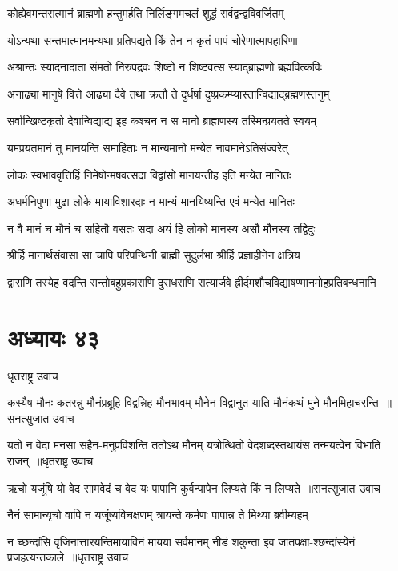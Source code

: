 \twolineshloka
{कोह्येवमन्तरात्मानं ब्राह्मणो हन्तुमर्हति}
{निर्लिङ्गमचलं शुद्धं सर्वद्वन्द्वविवर्जितम्}


\twolineshloka
{योऽन्यथा सन्तमात्मानमन्यथा प्रतिपद्यते}
{किं तेन न कृतं पापं चोरेणात्मापहारिणा}


\twolineshloka
{अश्रान्तः स्यादनादाता संमतो निरुपद्रवः}
{शिष्टो न शिष्टवत्स स्याद्ब्राह्मणो ब्रह्मवित्कविः}


\twolineshloka
{अनाढ्या मानुषे वित्ते आढ्या दैवे तथा क्रतौ}
{ते दुर्धर्षा दुष्प्रकम्प्यास्तान्विद्याद्ब्रह्मणस्तनुम्}


\twolineshloka
{सर्वान्खिष्टकृतो देवान्विद्याद्य इह कश्चन}
{न स मानो ब्राह्मणस्य तस्मिन्प्रयतते स्वयम्}


\twolineshloka
{यमप्रयतमानं तु मानयन्ति समाहिताः}
{न मान्यमानो मन्येत नावमानेऽतिसंज्वरेत्}


\twolineshloka
{लोकः स्वभाववृत्तिर्हि निमेषोन्मषवत्सदा}
{विद्वांसो मानयन्तीह इति मन्येत मानितः}


\twolineshloka
{अधर्मनिपुणा मुढा लोके मायाविशारदाः}
{न मान्यं मानयिष्यन्ति एवं मन्येत मानितः}


\twolineshloka
{न वै मानं च मौनं च सहितौ वसतः सदा}
{अयं हि लोको मानस्य असौ मौनस्य तद्विदुः}


\twolineshloka
{श्रीर्हि मानार्थसंवासा सा चापि परिपन्थिनी}
{ब्राह्मी सुदुर्लभा श्रीर्हि प्रज्ञाहीनेन क्षत्रिय}


\twolineshloka
{द्वाराणि तस्येह वदन्ति सन्तोबहुप्रकाराणि दुराधराणि}
{सत्यार्जवे ह्रीर्दमशौचविद्याषण्मानमोहप्रतिबन्धनानि}


\chapter{अध्यायः ४३}
\twolineshloka
{धृतराष्ट्र उवाच}
{}


\threelineshloka
{कस्यैष मौनः कतरन्नु मौनंप्रब्रूहि विद्वन्निह मौनभावम्}
{मौनेन विद्वानुत याति मौनंकथं मुने मौनमिहाचरन्ति ॥सनत्सुजात उवाच}
{}


\threelineshloka
{यतो न वेदा मनसा सहैन-मनुप्रविशन्ति ततोऽथ मौनम्}
{यत्रोत्थितो वेदशब्दस्तथायंस तन्मयत्वेन विभाति राजन् ॥धृतराष्ट्र उवाच}
{}


\threelineshloka
{ऋचो यजूंषि यो वेद सामवेदं च वेद यः}
{पापानि कुर्वन्पापेन लिप्यते किं न लिप्यते ॥सनत्सुजात उवाच}
{}


\twolineshloka
{नैनं सामान्यृचो वापि न यजूंष्यविचक्षणम्}
{त्रायन्ते कर्मणः पापान्न ते मिथ्या ब्रवीम्यहम्}


\threelineshloka
{न च्छन्दांसि वृजिनात्तारयन्तिमायाविनं मायया सर्वमानम्}
{नीडं शकुन्ता इव जातपक्षा-श्छन्दांस्येनं प्रजहत्यन्तकाले ॥धृतराष्ट्र उवाच}
{}


